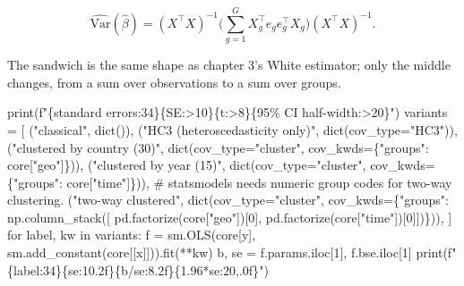 \documentclass[
  letterpaper,
  10pt,
  twoside,
  openright,
  numbers=noenddot,
  chapterprefix=true]{scrbook}
\newenvironment{Shaded}{}{}
\newcommand{\BuiltInTok}[1]{\textcolor[rgb]{0.84,0.23,0.29}{#1}}
\newcommand{\CommentTok}[1]{\textcolor[rgb]{0.42,0.45,0.49}{#1}}
\newcommand{\ControlFlowTok}[1]{\textcolor[rgb]{0.84,0.23,0.29}{#1}}
\newcommand{\DecValTok}[1]{\textcolor[rgb]{0.00,0.36,0.77}{#1}}
\newcommand{\FloatTok}[1]{\textcolor[rgb]{0.00,0.36,0.77}{#1}}
\newcommand{\KeywordTok}[1]{\textcolor[rgb]{0.84,0.23,0.29}{#1}}
\newcommand{\NormalTok}[1]{\textcolor[rgb]{0.14,0.16,0.18}{#1}}
\newcommand{\OperatorTok}[1]{\textcolor[rgb]{0.14,0.16,0.18}{#1}}
\newcommand{\SpecialCharTok}[1]{\textcolor[rgb]{0.00,0.36,0.77}{#1}}
\newcommand{\SpecialStringTok}[1]{\textcolor[rgb]{0.01,0.18,0.38}{#1}}
\newcommand{\StringTok}[1]{\textcolor[rgb]{0.01,0.18,0.38}{#1}}
\begin{document}
\[
\widehat{\mathrm{Var}}(\hat\beta)
= (X^\top X)^{-1}
\Big( \sum_{g=1}^{G} X_g^\top e_g e_g^\top X_g \Big)
(X^\top X)^{-1} .
\]

The sandwich is the same shape as chapter 3's White estimator; only the
middle changes, from a sum over observations to a sum over groups.

\label{check-clustering}
\begin{Shaded}
\begin{Highlighting}[]
\BuiltInTok{print}\NormalTok{(}\SpecialStringTok{f"}\SpecialCharTok{\{}\StringTok{\textquotesingle{}standard errors\textquotesingle{}}\SpecialCharTok{:34\}\{}\StringTok{\textquotesingle{}SE\textquotesingle{}}\SpecialCharTok{:\textgreater{}10\}\{}\StringTok{\textquotesingle{}t\textquotesingle{}}\SpecialCharTok{:\textgreater{}8\}\{}\StringTok{\textquotesingle{}95\% CI half{-}width\textquotesingle{}}\SpecialCharTok{:\textgreater{}20\}}\SpecialStringTok{"}\NormalTok{)}
\NormalTok{variants }\OperatorTok{=}\NormalTok{ [}
\NormalTok{    (}\StringTok{"classical"}\NormalTok{, }\BuiltInTok{dict}\NormalTok{()),}
\NormalTok{    (}\StringTok{"HC3 (heteroscedasticity only)"}\NormalTok{, }\BuiltInTok{dict}\NormalTok{(cov\_type}\OperatorTok{=}\StringTok{"HC3"}\NormalTok{)),}
\NormalTok{    (}\StringTok{"clustered by country (30)"}\NormalTok{, }\BuiltInTok{dict}\NormalTok{(cov\_type}\OperatorTok{=}\StringTok{"cluster"}\NormalTok{,}
\NormalTok{                                       cov\_kwds}\OperatorTok{=}\NormalTok{\{}\StringTok{"groups"}\NormalTok{: core[}\StringTok{"geo"}\NormalTok{]\})),}
\NormalTok{    (}\StringTok{"clustered by year (15)"}\NormalTok{, }\BuiltInTok{dict}\NormalTok{(cov\_type}\OperatorTok{=}\StringTok{"cluster"}\NormalTok{,}
\NormalTok{                                    cov\_kwds}\OperatorTok{=}\NormalTok{\{}\StringTok{"groups"}\NormalTok{: core[}\StringTok{"time"}\NormalTok{]\})),}
    \CommentTok{\# statsmodels needs numeric group codes for two{-}way clustering.}
\NormalTok{    (}\StringTok{"two{-}way clustered"}\NormalTok{, }\BuiltInTok{dict}\NormalTok{(cov\_type}\OperatorTok{=}\StringTok{"cluster"}\NormalTok{,}
\NormalTok{                               cov\_kwds}\OperatorTok{=}\NormalTok{\{}\StringTok{"groups"}\NormalTok{: np.column\_stack([}
\NormalTok{                                   pd.factorize(core[}\StringTok{"geo"}\NormalTok{])[}\DecValTok{0}\NormalTok{],}
\NormalTok{                                   pd.factorize(core[}\StringTok{"time"}\NormalTok{])[}\DecValTok{0}\NormalTok{]])\})),}
\NormalTok{]}
\ControlFlowTok{for}\NormalTok{ label, kw }\KeywordTok{in}\NormalTok{ variants:}
\NormalTok{    f }\OperatorTok{=}\NormalTok{ sm.OLS(core[y], sm.add\_constant(core[[x]])).fit(}\OperatorTok{**}\NormalTok{kw)}
\NormalTok{    b, se }\OperatorTok{=}\NormalTok{ f.params.iloc[}\DecValTok{1}\NormalTok{], f.bse.iloc[}\DecValTok{1}\NormalTok{]}
    \BuiltInTok{print}\NormalTok{(}\SpecialStringTok{f"}\SpecialCharTok{\{}\NormalTok{label}\SpecialCharTok{:34\}\{}\NormalTok{se}\SpecialCharTok{:10.2f\}\{}\NormalTok{b}\OperatorTok{/}\NormalTok{se}\SpecialCharTok{:8.2f\}\{}\FloatTok{1.96}\OperatorTok{*}\NormalTok{se}\SpecialCharTok{:20,.0f\}}\SpecialStringTok{"}\NormalTok{)}
\end{Highlighting}
\end{Shaded}
\end{document}
